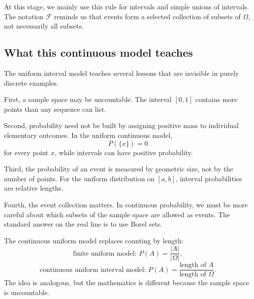 At this stage, we mainly use this rule for intervals and simple unions of
intervals. The notation \(\mathcal{F}\) reminds us that events form a selected
collection of subsets of \(\Omega\), not necessarily all subsets.

\subsection*{What this continuous model teaches}

The uniform interval model teaches several lessons that are invisible in purely
discrete examples.

First, a sample space may be uncountable. The interval \([0,1]\) contains more
points than any sequence can list.

Second, probability need not be built by assigning positive mass to individual
elementary outcomes. In the uniform continuous model,
\[
P(\{x\})=0
\]
for every point \(x\), while intervals can have positive probability.

Third, the probability of an event is measured by geometric size, not by the
number of points. For the uniform distribution on \([a,b]\), interval
probabilities are relative lengths.

Fourth, the event collection matters. In continuous probability, we must be more
careful about which subsets of the sample space are allowed as events. The
standard answer on the real line is to use Borel sets.

\begin{theorembox}
The continuous uniform model replaces counting by length:
\[
\text{finite uniform model: } P(A)=\frac{|A|}{|\Omega|},
\]
\[
\text{continuous uniform interval model: } P(A)=\frac{\text{length of }A}{\text{length of }\Omega}.
\]
The idea is analogous, but the mathematics is different because the sample space
is uncountable.
\end{theorembox}
